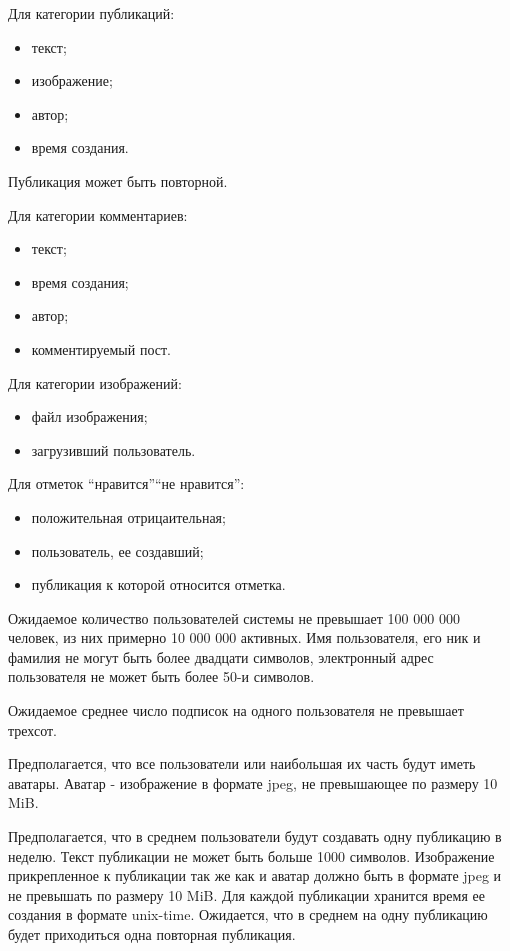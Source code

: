 Для категории публикаций:
\begin{itemize}
\item текст;
\item изображение;
\item автор;
\item время создания.
\end{itemize}
Публикация может быть повторной.

Для категории комментариев:
\begin{itemize}
\item текст;
\item время создания;
\item автор;
\item комментируемый пост.
\end{itemize}

Для категории изображений:
\begin{itemize}
\item файл изображения;
\item загрузивший пользователь.
\end{itemize}

Для отметок ``нравится''\/``не нравится'':
\begin{itemize}
\item положительная \/ отрицаительная;
\item пользователь, ее создавший;
\item публикация к которой относится отметка.
\end{itemize}


Ожидаемое количество пользователей системы не превышает 100 000 000 человек,
из них примерно 10 000 000 активных.
Имя пользователя, его ник и фамилия не могут быть более двадцати символов, электронный адрес пользователя не может быть более 50-и символов.

Ожидаемое среднее число подписок на одного пользователя не превышает трехсот.

Предполагается, что все пользователи или наибольшая их часть будут иметь аватары.
Аватар - изображение  в формате jpeg, не превышающее по размеру 10 MiB.

Предполагается, что в среднем пользователи будут создавать одну публикацию 
в неделю.
Текст публикации не может быть больше 1000 символов.
Изображение прикрепленное к публикации так же как и аватар 
должно быть в формате jpeg и не превышать по размеру 10 MiB.
Для каждой публикации хранится время ее создания в формате unix-time.
Ожидается, что в среднем на одну публикацию будет приходиться 
одна повторная публикация.

